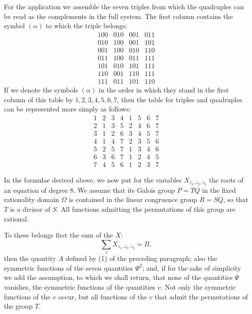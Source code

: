 \documentclass[11pt]{article}
\begin{document}
For the application we assemble the seven triples from which the quadruples can be read as the complements in the full system. The first column contains the symbol $(\alpha)$ to which the triple belongs:
\[
\begin{array}{c|ccc}
100&010&001&011\\
010&100&001&101\\
001&100&010&110\\
011&100&011&111\\
101&010&101&111\\
110&001&110&111\\
111&011&101&110
\end{array}
\]
If we denote the symbols $(\alpha)$ in the order in which they stand in the first column of this table by $1,2,3,4,5,6,7$, then the table for triples and quadruples can be represented more simply as follows:
\[
\begin{array}{c|ccc|cccc}
1&2&3&4&1&5&6&7\\
2&1&3&5&2&4&6&7\\
3&1&2&6&3&4&5&7\\
4&1&4&7&2&3&5&6\\
5&2&5&7&1&3&4&6\\
6&3&6&7&1&2&4&5\\
7&4&5&6&1&2&3&7
\end{array}
\]

In the formulae derived above, we now put for the variables $X_{z_1,z_2,z_3}$ the roots of an equation of degree $8$. We assume that its Galois group $P=TQ$ in the fixed rationality domain $\Omega$ is contained in the linear congruence group $R=SQ$, so that $T$ is a divisor of $S$. All functions admitting the permutations of this group are rational.

To these belongs first the sum of the $X$:
\begin{equation}
 \sum_z X_{z_1,z_2,z_3}=B,
 \tag{1}
\end{equation}
then the quantity $A$ defined by (1) of the preceding paragraph; also the symmetric functions of the seven quantities $\Psi^2$; and, if for the sake of simplicity we add the assumption, to which we shall return, that none of the quantities $\Psi$ vanishes, the symmetric functions of the quantities $v$. Not only the symmetric functions of the $v$ occur, but all functions of the $v$ that admit the permutations of the group $T$.
\end{document}
